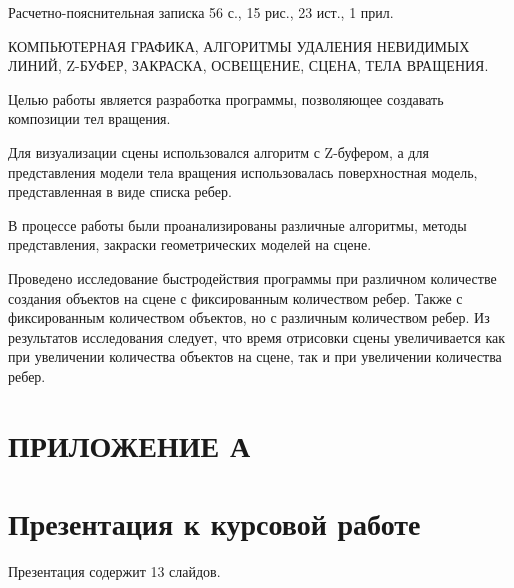 




    \normalsize




\setcounter{page}{2}

Расчетно-пояснительная записка 56 с., 15 рис., 23 ист., 1 прил.

КОМПЬЮТЕРНАЯ ГРАФИКА, АЛГОРИТМЫ УДАЛЕНИЯ НЕВИДИМЫХ ЛИНИЙ, Z-БУФЕР, ЗАКРАСКА, ОСВЕЩЕНИЕ, СЦЕНА, ТЕЛА ВРАЩЕНИЯ.

Целью работы является разработка программы, позволяющее создавать композиции тел вращения.

Для визуализации сцены использовался алгоритм с Z-буфером, а для представления модели тела вращения использовалась поверхностная модель, представленная в виде списка ребер.

В процессе работы были проанализированы различные алгоритмы, методы представления, закраски геометрических моделей на сцене. 

Проведено исследование быстродействия программы при различном количестве создания объектов на сцене с фиксированным количеством ребер. 
Также с фиксированным количеством объектов, но с различным количеством ребер. 
Из результатов исследования следует, что время отрисовки сцены увеличивается как при увеличении количества объектов на сцене, так и при увеличении количества ребер.
\newpage
\renewcommand{\contentsname}{\normalsize\bfseries\centering СОДЕРЖАНИЕ}
    \tableofcontents
    \normalsize













\section*{\centering ПРИЛОЖЕНИЕ А}

\section*{Презентация к курсовой работе}
Презентация содержит 13 слайдов.

